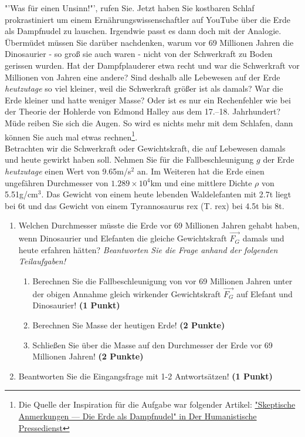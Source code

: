 \documentclass[a4paper, 9pt]{scrartcl}\usepackage[]{graphicx}\usepackage[]{xcolor}
\begin{document}
"'Was für einen Unsinn!"', rufen Sie. Jetzt haben Sie kostbaren Schlaf prokrastiniert um einem Ernährungswissenschaftler auf YouTube über die Erde als Dampfnudel zu lauschen. Irgendwie passt es dann doch mit der Analogie. Übermüdet müssen Sie darüber nachdenken, warum vor 69 Millionen Jahren die Dinosaurier - so groß sie auch waren - nicht von der Schwerkraft zu Boden gerissen wurden. Hat der Dampfplauderer etwa recht und war die Schwerkraft vor Millionen von Jahren eine andere?  Sind deshalb alle Lebewesen auf der Erde \textit{heutzutage} so viel kleiner, weil die Schwerkraft größer ist als damals? War die Erde kleiner und hatte weniger Masse? Oder ist es nur ein Rechenfehler wie bei der Theorie der Hohlerde von Edmond Halley aus dem 17.–18. Jahrhundert? Müde reiben Sie sich die Augen. So wird es nichts mehr mit dem Schlafen, dann können Sie auch mal etwas rechnen\footnote{Die Quelle der Inspiration
  für die Aufgabe war folgender Artikel:
  \href{https://hpd.de/artikel/erde-dampfnudel-22236}{"Skeptische Anmerkungen --- Die Erde als Dampfnudel" in Der Humanistische Pressedienst}}.  \\

Betrachten wir die Schwerkraft oder Gewichtskraft, die auf Lebewesen damals und heute gewirkt haben soll. Nehmen Sie für die Fallbeschleunigung $g$ der Erde \textit{heutzutage} einen Wert von 9.65m/s$^2$ an. Im Weiteren hat die Erde einen ungefähren Durchmesser von \ensuremath{1.289\times 10^{4}}km und eine mittlere Dichte $\rho$ von 5.51g/cm$^3$. Das Gewicht von einem heute lebenden Waldelefanten mit 2.7t liegt bei 6t und das Gewicht von einem Tyrannosaurus rex (T. rex) bei 4.5t bis 8t.

\begin{enumerate}
\item Welchen Durchmesser müsste die Erde vor 69 Millionen Jahren gehabt haben, wenn Dinosaurier und Elefanten die gleiche Gewichtskraft $\overrightarrow{F_G}$ damals und heute erfahren hätten? \textit{Beantworten Sie die Frage anhand der folgenden Teilaufgaben!}
\begin{enumerate}
\item Berechnen Sie die Fallbeschleunigung von vor 69 Millionen Jahren unter der obigen Annahme gleich wirkender Gewichtskraft $\overrightarrow{F_G}$ auf Elefant und Dinosaurier! \textbf{(1 Punkt)}
\item Berechnen Sie Masse der heutigen Erde! \textbf{(2 Punkte)}
\item Schließen Sie über die Masse auf den Durchmesser der Erde vor 69 Millionen Jahren! \textbf{(2 Punkte)}
\end{enumerate}
\item Beantworten Sie die Eingangsfrage mit 1-2 Antwortsätzen! \textbf{(1 Punkt)}
\end{enumerate}
\end{document}
